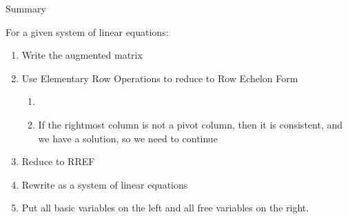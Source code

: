 \documentclass[xcoler=dvipsnames, aspectratio=169]{beamer}
\begin{document}
    \begin{frame}{Summary}
        \begin{tcolorbox}
            For a given system of linear equations:
            \begin{enumerate}
                \item Write the augmented matrix
                \item Use Elementary Row Operations to reduce to Row Echelon Form
                    \begin{enumerate}
                        \item {}
                        \item If the rightmost column is not a pivot column, then it is consistent, and we have a solution, so we need to continue
                    \end{enumerate}
                \item Reduce to RREF
                \item Rewrite as a system of linear equations
                \item Put all basic variables on the left and all free variables on the right.
            \end{enumerate}
        \end{tcolorbox}
    \end{frame}
\end{document}
